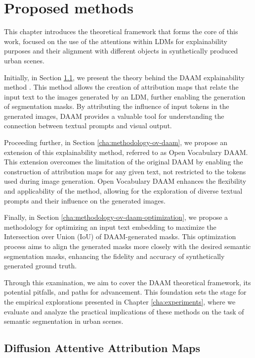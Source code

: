 \chapter{Proposed methods}
\label{cha:methodology}

This chapter introduces the theoretical framework that forms the core of this work, focused on the use of the attentions within LDMs for explainability purposes and their alignment with different objects in synthetically produced urban scenes.

Initially, in Section \ref{cha:methodology-daam}, we present the theory behind the DAAM explainability method \cite{DAAM}. This method allows the creation of attribution maps that relate the input text to the images generated by an LDM, further enabling the generation of segmentation masks. By attributing the influence of input tokens in the generated images, DAAM provides a valuable tool for understanding the connection between textual prompts and visual output.

Proceeding further, in Section \ref{cha:methodology-ov-daam}, we propose an extension of this explainability method, referred to as Open Vocabulary DAAM. This extension overcomes the limitation of the original DAAM by enabling the construction of attribution maps for any given text, not restricted to the tokens used during image generation. Open Vocabulary DAAM enhances the flexibility and applicability of the method, allowing for the exploration of diverse textual prompts and their influence on the generated images.

Finally, in Section \ref{cha:methodology-ov-daam-optimization}, we propose a methodology for optimizing an input text embedding to maximize the Intersection over Union (IoU) of DAAM-generated masks. This optimization process aims to align the generated masks more closely with the desired semantic segmentation masks, enhancing the fidelity and accuracy of synthetically generated ground truth.

Through this examination, we aim to cover the DAAM theoretical framework, its potential pitfalls, and paths for advancement. This foundation sets the stage for the empirical explorations presented in Chapter \ref{cha:experiments}, where we evaluate and analyze the practical implications of these methods on the task of semantic segmentation in urban scenes.

\section{Diffusion Attentive Attribution Maps}
\label{cha:methodology-daam}


